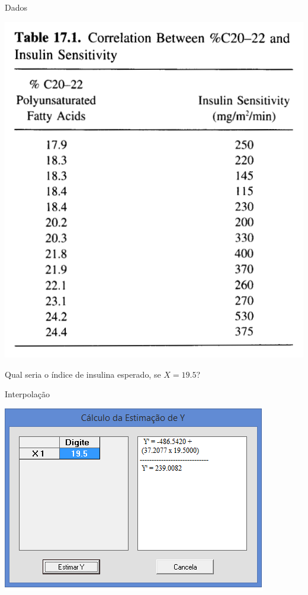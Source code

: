 \documentclass{beamer}
\begin{document}
\begin{frame}{Dados}
  \begin{center}
    \includegraphics[height=0.7\textheight]{Pratica_Desc/table}

    Qual seria o índice de insulina esperado, se $X=19.5$?
  \end{center}
\end{frame}


\begin{frame}{Interpolação}
  \begin{center}
    \includegraphics[height=0.9\textheight]{Pratica_Assoc/interpolacao}
  \end{center}
\end{frame}
\end{document}
